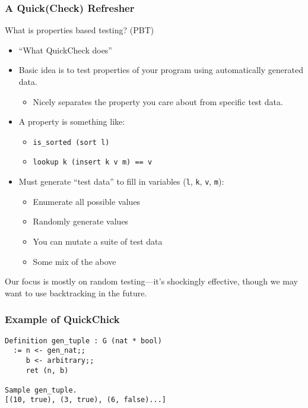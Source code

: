 \documentclass{beamer}
\begin{document}
\begin{frame}
  \frametitle{A Quick(Check) Refresher}

  What is properties based testing? (PBT)

  \begin{itemize}
  \item ``What QuickCheck does''
  \item Basic idea is to test properties of your program using
    automatically generated data.
    \begin{itemize}
    \item Nicely separates the property you care about from specific
      test data.
    \end{itemize}
  \item A property is something like:
    \begin{itemize}
    \item {\tt is\_sorted (sort l)}
    \item {\tt lookup k (insert k v m) == v}
    \end{itemize}
  \item Must generate ``test data'' to fill in variables ({\tt l}, {\tt k}, {\tt v}, {\tt m}):
    \begin{itemize}
    \item Enumerate all possible values
    \item Randomly generate values
    \item You can mutate a suite of test data~\cite{10.1145/3360607}
    \item Some mix of the above
    \end{itemize}
  \end{itemize}
  
  \pause
  
  Our focus is mostly on random testing---it's shockingly effective,
  though we may want to use backtracking in the future.
\end{frame}

\begin{frame}[fragile]
  \frametitle{Example of QuickChick}

\begin{lstlisting}[language=SSR]
Definition gen_tuple : G (nat * bool)
  := n <- gen_nat;;
     b <- arbitrary;;
     ret (n, b)

Sample gen_tuple.
[(10, true), (3, true), (6, false)...]
\end{lstlisting}
\end{frame}
\end{document}
